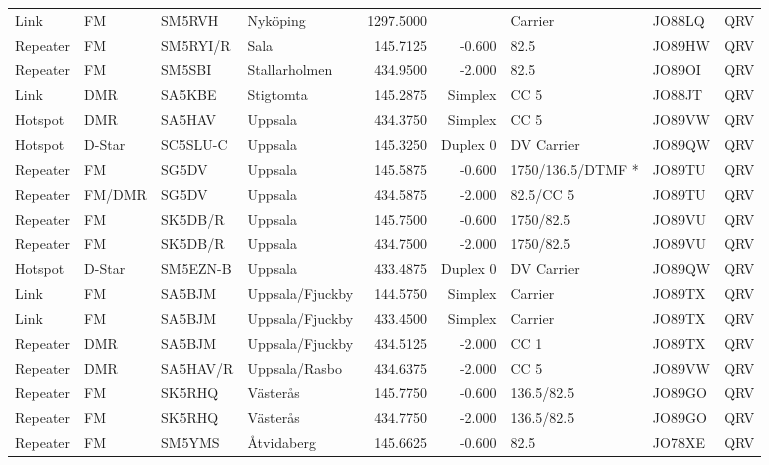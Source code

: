 \begin{landscape}
\begin{longtable}{llllrrlll}
	Link     & FM      & SM5RVH   & Nyköping             &    1297.5000 &            & Carrier           & JO88LQ      & QRV      \\
	Repeater & FM      & SM5RYI/R & Sala                 &     145.7125 &     -0.600 & 82.5              & JO89HW      & QRV      \\
	Repeater & FM      & SM5SBI   & Stallarholmen        &     434.9500 &     -2.000 & 82.5              & JO89OI      & QRV      \\
	Link     & DMR     & SA5KBE   & Stigtomta            &     145.2875 &    Simplex & CC 5              & JO88JT      & QRV      \\
	Hotspot  & DMR     & SA5HAV   & Uppsala              &     434.3750 &    Simplex & CC 5              & JO89VW      & QRV      \\
	Hotspot  & D-Star  & SC5SLU-C & Uppsala              &     145.3250 &   Duplex 0 & DV Carrier        & JO89QW      & QRV      \\
	Repeater & FM      & SG5DV    & Uppsala              &     145.5875 &     -0.600 & 1750/136.5/DTMF * & JO89TU      & QRV      \\
	Repeater & FM/DMR  & SG5DV    & Uppsala              &     434.5875 &     -2.000 & 82.5/CC 5         & JO89TU      & QRV      \\
	Repeater & FM      & SK5DB/R  & Uppsala              &     145.7500 &     -0.600 & 1750/82.5         & JO89VU      & QRV      \\
	Repeater & FM      & SK5DB/R  & Uppsala              &     434.7500 &     -2.000 & 1750/82.5         & JO89VU      & QRV      \\
	Hotspot  & D-Star  & SM5EZN-B & Uppsala              &     433.4875 &   Duplex 0 & DV Carrier        & JO89QW      & QRV      \\
	Link     & FM      & SA5BJM   & Uppsala/Fjuckby      &     144.5750 &    Simplex & Carrier           & JO89TX      & QRV      \\
	Link     & FM      & SA5BJM   & Uppsala/Fjuckby      &     433.4500 &    Simplex & Carrier           & JO89TX      & QRV      \\
	Repeater & DMR     & SA5BJM   & Uppsala/Fjuckby      &     434.5125 &     -2.000 & CC 1              & JO89TX      & QRV      \\
	Repeater & DMR     & SA5HAV/R & Uppsala/Rasbo        &     434.6375 &     -2.000 & CC 5              & JO89VW      & QRV      \\
	Repeater & FM      & SK5RHQ   & Västerås             &     145.7750 &     -0.600 & 136.5/82.5        & JO89GO      & QRV      \\
	Repeater & FM      & SK5RHQ   & Västerås             &     434.7750 &     -2.000 & 136.5/82.5        & JO89GO      & QRV      \\
	Repeater & FM      & SM5YMS   & Åtvidaberg           &     145.6625 &     -0.600 & 82.5              & JO78XE      & QRV     
\end{longtable}



\end{landscape}
